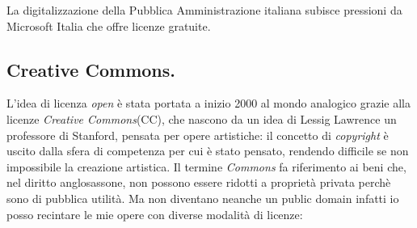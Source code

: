\documentclass[a4page, 11pt, twocolumn]{article}
\begin{document}
La digitalizzazione della Pubblica Amministrazione italiana subisce pressioni da Microsoft Italia che offre licenze gratuite.

\subsection{Creative Commons.}
L'idea di licenza \textit{open} è stata portata a inizio 2000 al mondo analogico grazie alla licenze \textit{Creative Commons}(CC), che nascono da un idea di Lessig Lawrence un professore di Stanford, pensata per opere artistiche: il concetto di \textit{copyright} è uscito dalla sfera di competenza per cui è stato pensato, rendendo difficile se non impossibile la creazione artistica.
Il termine \textit{Commons} fa riferimento ai beni che, nel diritto anglosassone, non possono essere ridotti a proprietà privata perchè sono di pubblica utilità.
Ma non diventano neanche un public domain infatti io posso recintare le mie opere con diverse modalità di licenze:
\end{document}
